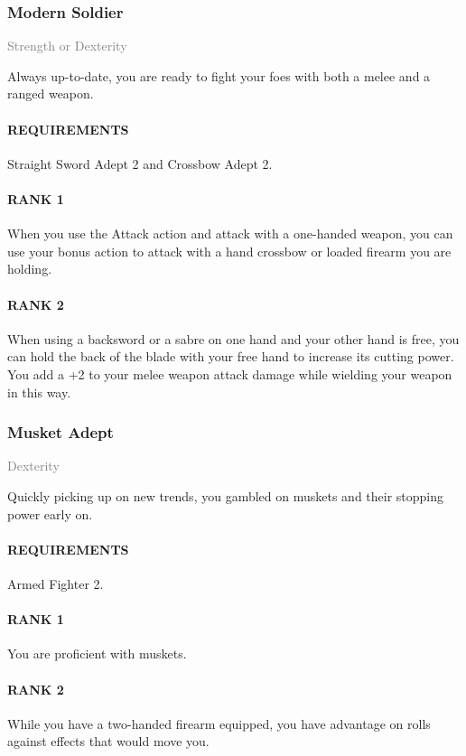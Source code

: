 \subsubsection{Modern Soldier} \label{feat::modernsoldier}
\small{\textcolor{gray}{Strength or Dexterity}}

\normalsize
Always up-to-date, you are ready to fight your foes with both a melee and a ranged weapon.
\paragraph{REQUIREMENTS} Straight Sword Adept 2 and Crossbow Adept 2.
\paragraph{RANK 1} When you use the Attack action and attack with a one-handed weapon, you can use your bonus action to attack with a hand crossbow or loaded firearm you are holding.
\paragraph{RANK 2} When using a backsword or a sabre on one hand and your other hand is free, you can hold the back of the blade with your free hand to increase its cutting power.
You add a +2 to your melee weapon attack damage while wielding your weapon in this way.

\subsubsection{Musket Adept} \label{feat::musketadept}
\small{\textcolor{gray}{Dexterity}}

\normalsize
Quickly picking up on new trends, you gambled on muskets and their stopping power early on.
\paragraph{REQUIREMENTS} Armed Fighter 2.
\paragraph{RANK 1} You are proficient with muskets.
\paragraph{RANK 2} While you have a two-handed firearm equipped, you have advantage on rolls against effects that would move you.

